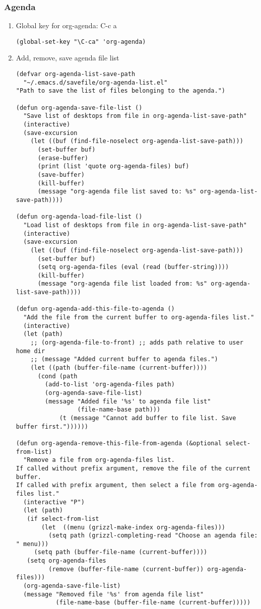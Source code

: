 \documentclass{article}
\begin{document}
\subsubsection{Agenda}
\label{sec-2-5-8}
\begin{enumerate}
\item Global key for org-agenda: C-c a
\label{sec-2-5-8-1}
\begin{verbatim}
(global-set-key "\C-ca" 'org-agenda)
\end{verbatim}
\item Add, remove, save agenda file list
\label{sec-2-5-8-2}

\begin{verbatim}
(defvar org-agenda-list-save-path
  "~/.emacs.d/savefile/org-agenda-list.el"
"Path to save the list of files belonging to the agenda.")

(defun org-agenda-save-file-list ()
  "Save list of desktops from file in org-agenda-list-save-path"
  (interactive)
  (save-excursion
    (let ((buf (find-file-noselect org-agenda-list-save-path)))
      (set-buffer buf)
      (erase-buffer)
      (print (list 'quote org-agenda-files) buf)
      (save-buffer)
      (kill-buffer)
      (message "org-agenda file list saved to: %s" org-agenda-list-save-path))))

(defun org-agenda-load-file-list ()
  "Load list of desktops from file in org-agenda-list-save-path"
  (interactive)
  (save-excursion
    (let ((buf (find-file-noselect org-agenda-list-save-path)))
      (set-buffer buf)
      (setq org-agenda-files (eval (read (buffer-string))))
      (kill-buffer)
      (message "org-agenda file list loaded from: %s" org-agenda-list-save-path))))

(defun org-agenda-add-this-file-to-agenda ()
  "Add the file from the current buffer to org-agenda-files list."
  (interactive)
  (let (path)
    ;; (org-agenda-file-to-front) ;; adds path relative to user home dir
    ;; (message "Added current buffer to agenda files.")
    (let ((path (buffer-file-name (current-buffer))))
      (cond (path
        (add-to-list 'org-agenda-files path)
        (org-agenda-save-file-list)
        (message "Added file '%s' to agenda file list"
                 (file-name-base path)))
            (t (message "Cannot add buffer to file list. Save buffer first."))))))

(defun org-agenda-remove-this-file-from-agenda (&optional select-from-list)
  "Remove a file from org-agenda-files list.
If called without prefix argument, remove the file of the current buffer.
If called with prefix argument, then select a file from org-agenda-files list."
  (interactive "P")
  (let (path)
   (if select-from-list
       (let  ((menu (grizzl-make-index org-agenda-files)))
         (setq path (grizzl-completing-read "Choose an agenda file: " menu)))
     (setq path (buffer-file-name (current-buffer))))
   (setq org-agenda-files
         (remove (buffer-file-name (current-buffer)) org-agenda-files)))
  (org-agenda-save-file-list)
  (message "Removed file '%s' from agenda file list"
           (file-name-base (buffer-file-name (current-buffer)))))


\end{verbatim}
\end{enumerate}
\end{document}
